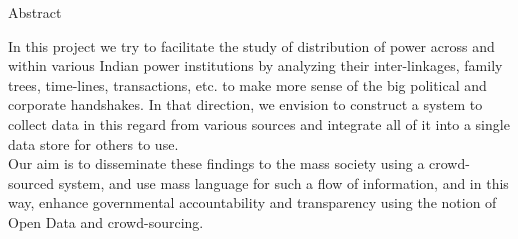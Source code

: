 \begin{center}
\LARGE{Abstract}
\end{center}

\vspace{0.5in}

In this project we try to facilitate the study of distribution of power across and within various Indian power institutions by analyzing their inter-linkages, family trees, time-lines, transactions, etc. to make more sense of the big political and corporate handshakes. In that direction, we envision to construct a system to collect data in this regard from various sources and integrate all of it into a single data store for others to use. \\

Our aim is to disseminate these findings to the mass society using a crowd-sourced system, and use mass language for such a flow of information, and in this way, enhance governmental accountability and transparency using the notion of Open Data and crowd-sourcing.


